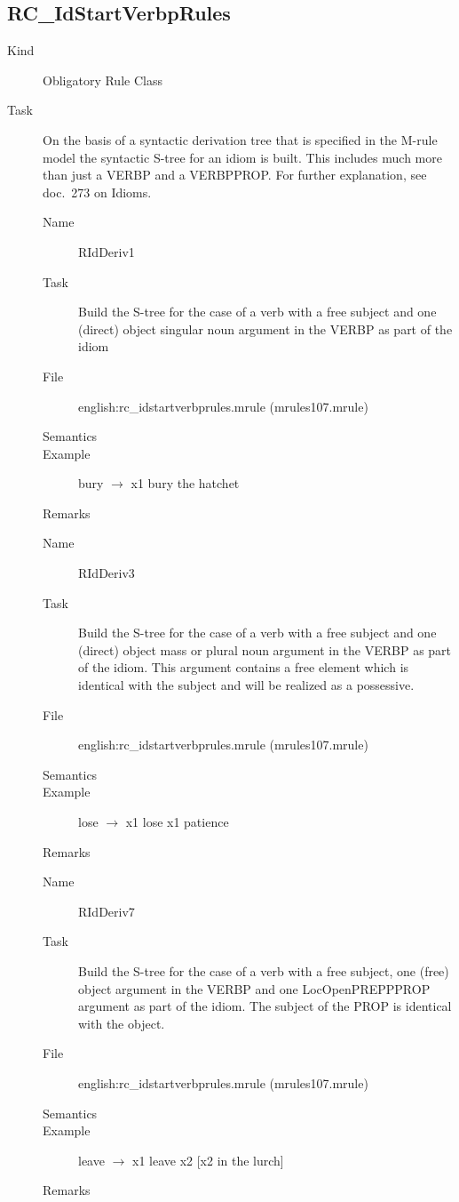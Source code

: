 \newpage
\subsection{RC\_IdStartVerbpRules}

\begin{description}
\item[Kind] Obligatory Rule Class
\item[Task] On the basis of a syntactic derivation tree that is specified in 
the M-rule  model the syntactic S-tree for an idiom is built. This includes 
much more than just a VERBP and a VERBPPROP. For further explanation, see doc.\ 
273 on Idioms.

\vspace{1 cm}
\begin{description}
\item[Name] RIdDeriv1
\item[Task] Build the S-tree for the case of a verb with a free subject and 
one (direct) object singular noun argument in the VERBP as part of the idiom
\item[File] english:rc\_idstartverbprules.mrule (mrules107.mrule)
\item[Semantics]
\item[Example] bury $\rightarrow$ x1 bury the hatchet
\item[Remarks]
\end{description}

\vspace{1 cm}
\begin{description}
\item[Name] RIdDeriv3
\item[Task] Build the S-tree for the case of a verb with a free subject and 
one (direct) object 
mass or plural noun argument in the VERBP as part of the idiom. This argument 
contains a 
free element which is identical with the subject and will be realized as a 
possessive.
\item[File] english:rc\_idstartverbprules.mrule (mrules107.mrule)
\item[Semantics]
\item[Example] lose $\rightarrow$ x1 lose x1 patience
\item[Remarks]
\end{description}

\vspace{1 cm}
\begin{description}
\item[Name] RIdDeriv7
\item[Task] Build the S-tree for the case of a verb with a free subject,
one (free) object 
argument in the VERBP and one LocOpenPREPPPROP argument as part of the idiom.
The subject of the PROP is identical with the object.
\item[File] english:rc\_idstartverbprules.mrule (mrules107.mrule)
\item[Semantics]
\item[Example] leave $\rightarrow$ x1 leave x2 [x2 in the lurch]
\item[Remarks]
\end{description}


\end{description}
